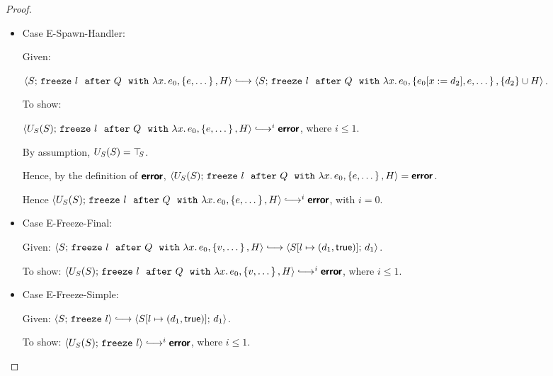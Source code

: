 \begin{proof}
\begin{itemize}
  \item Case {\sc E-Spawn-Handler}:

    Given:

    $\config{S}{\freezeafterfull{l}{Q}{\lam{x}{e_0}}{\setof{e,
          \dots}}{H}} \parstepsto
    \config{S}{\freezeafterfull{l}{Q}{\lam{x}{e_0}}{\setof{\subst{e_0}{x}{d_2},
          e, \dots}}{\{d_2\}\cup H}}$.

    To show:

    $\config{U_S(S)}{\freezeafterfull{l}{Q}{\lam{x}{e_0}}{\setof{e,
          \dots}}{H}} \parstepsto^i \error$, where $i \leq 1$.

    By assumption, $U_S(S) = \top\hspace{-0.85mm}_{S}$.

    Hence, by the definition of $\textbf{\textsf{error}}$,
    $\langle U_S(S);\, \mbox{\texttt{freeze}}~l~~{\mbox{\texttt{after}}}~Q~~{\mbox{\texttt{with}}}~\lambda x.\,e_0, \left\{e,
          \dots\right\}, H \rangle = \textbf{\textsf{error}}$.

    Hence
    $\config{U_S(S)}{\freezeafterfull{l}{Q}{\lam{x}{e_0}}{\setof{e,
          \dots}}{H}} \parstepsto^i \error$, with $i = 0$.

  \item Case {\sc E-Freeze-Final}:

    Given:
    $\config{S}{\freezeafterfull{l}{Q}{\lam{x}{e_0}}{\setof{v,
          \dots}}{H}} \parstepsto
    \config{\extS{S}{l}{d_1}{\frozentrue}}{d_1}$.

    To show:
    $\config{U_S(S)}{\freezeafterfull{l}{Q}{\lam{x}{e_0}}{\setof{v,
          \dots}}{H}} \parstepsto^i \error$, where $i \leq 1$.


  \item Case {\sc E-Freeze-Simple}:

    Given: $\config{S}{\freeze{l}} \parstepsto
    \config{\extS{S}{l}{d_1}{\frozentrue}}{d_1}$.

    To show: $\config{U_S(S)}{\freeze{l}} \parstepsto^i \error$,
    where $i \leq 1$.


  \end{itemize}
\end{proof}

